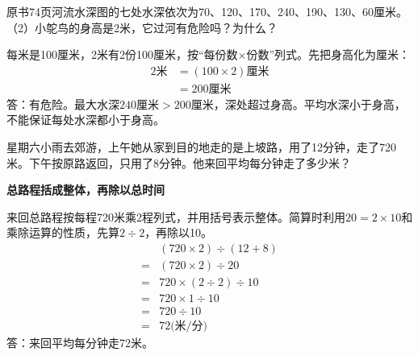 原书74页河流水深图的七处水深依次为70、120、170、240、190、130、60厘米。（2）小鸵鸟的身高是2米，它过河有危险吗？为什么？\par
\begin{BookAnswer}
每米是100厘米，2米有2份100厘米，按“每份数×份数”列式。先把身高化为厘米：\[\begin{aligned}2\text{米}&=(100\times2)\text{厘米}\\&=200\text{厘米}\end{aligned}\]答：有危险。最大水深\(240\)厘米\(>200\)厘米，深处超过身高。平均水深小于身高，不能保证每处水深都小于身高。
\end{BookAnswer}

星期六小雨去郊游，上午她从家到目的地走的是上坡路，用了12分钟，走了720米。下午按原路返回，只用了8分钟。他来回平均每分钟走了多少米？\par
\begin{BookAnswer}
\textbf{总路程括成整体，再除以总时间}\par 来回总路程按每程720米乘2程列式，并用括号表示整体。简算时利用\(20=2\times10\)和乘除运算的性质，先算\(2\div2\)，再除以10。\[\begin{aligned}&(720\times2)\div(12+8)\\={}&(720\times2)\div20\\={}&720\times(2\div2)\div10\\={}&720\times1\div10\\={}&720\div10\\={}&72\text{(米/分)}\end{aligned}\]答：来回平均每分钟走72米。
\end{BookAnswer}

